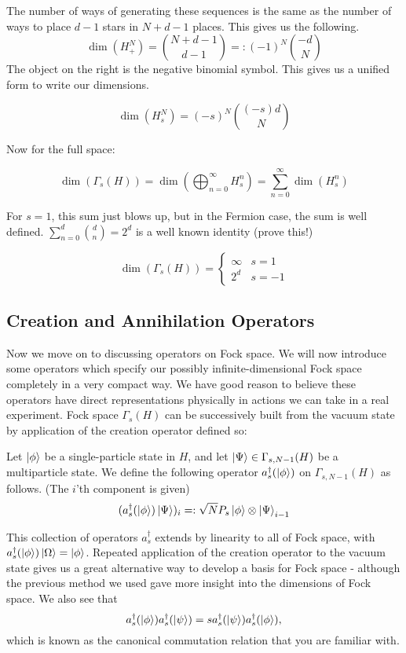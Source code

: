 The number of ways of generating these sequences is the same as the number of ways to place $d-1$ stars in $N+d-1$ places. This gives us the following.
\begin{equation}
\dim(H_+^N) = {{N+d-1}\choose{d-1}} =: (-1)^N {{-d}\choose N}
\end{equation}
The object on the right is the negative binomial symbol. This gives us a unified form to write our dimensions.

\begin{equation}
\dim(H_s^N) = (-s)^N {{(-s)d}\choose{N}}
\end{equation}

Now for the full space:

\[\dim(\Gamma_s(H))=\dim\left(\bigoplus_{n=0}^\infty H_s^n\right) = \sum_{n=0}^\infty \dim(H_s^n)\]

For $s=1$, this sum just blows up, but in the Fermion case, the sum is well defined. $\sum_{n=0}^d {d \choose n} = 2^d$ is a well known identity (prove this!)

\begin{equation}
\dim(\Gamma_s(H)) = \begin{cases}\infty & s = 1 \\ 2^d & s=-1\end{cases}
\end{equation}

\subsection{Creation and Annihilation Operators}
Now we move on to discussing operators on Fock space. We will now introduce some operators which specify our possibly infinite-dimensional Fock space completely in a very compact way. We have good reason to believe these operators have direct representations physically in actions we can take in a real experiment. Fock space $\Gamma_s(H)$ can be successively built from the vacuum state by application of the creation operator defined so:
\begin{defn}
Let $\ket{\phi}$ be a single-particle state in $H$, and let $\ket{\Psi} \in \Gamma_{s,N-1}(H)$ be a multiparticle state. We define the following operator $a^\dagger_s(\ket\phi)$ on $\Gamma_{s,N-1}(H)$ as follows. (The $i$'th component is given)
\[(a_s^\dagger(\ket\phi) \ket{\Psi})_i =: \sqrt{N} P_s \ket{\phi} \otimes \ket{\Psi}_{i-1}\]
\end{defn}
This collection of operators $a^\dagger_s$ extends by linearity to all of Fock space, with $a^\dagger_s(\ket{\phi})\ket{\Omega} = \ket{\phi}$. Repeated application of the creation operator to the vacuum state gives us a great alternative way to develop a basis for Fock space - although the previous method we used gave more insight into the dimensions of Fock space. We also see that \[a_s^\dagger(\ket{\phi})a_s^\dagger(\ket{\psi}) = s a^\dagger_s(\ket{\psi}) a^\dagger_s(\ket{\phi}),\] 
which is known as the canonical commutation relation that you are familiar with.
\pagebreak

